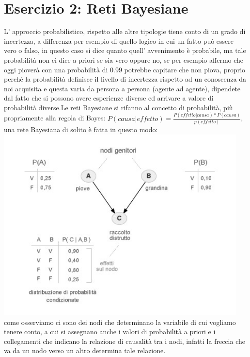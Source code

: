 		\section{Esercizio 2: Reti Bayesiane}
		\label{sec:es2}
		L' approccio probabilistico, rispetto alle altre tipologie tiene conto di un grado di incertezza, a differenza per esempio di quello logico in cui un fatto può essere vero o falso, in questo caso si dice quanto quell' avvenimento è probabile, ma tale probabilità non ci dice a priori se sia vero oppure no, se per esempio affermo che oggi pioverà con una probabilità di 0.99 potrebbe capitare che non piova, proprio perché la probabilità definisce il livello di incertezza rispetto ad un conoscenza da noi acquisita e questa varia da persona a persona (agente ad agente), dipendete dal fatto che si possono avere esperienze diverse ed arrivare a valore di probabilità diverse.Le reti Bayesiane si rifanno al concetto di probabilità, più propriamente alla regola di Bayes: $P(causa|effetto)=\frac{P(effetto|causa)*P(causa)}{p(effetto)}$, una rete Bayesiana di solito è fatta in questo modo:
		\includegraphics[width=0.95\textwidth, height=0.40\textheight]{retebayesiana.jpg}
		come osserviamo ci sono dei nodi che determinano la variabile di cui vogliamo tenere conto, a cui si assegnano anche i valori di probabilità a priori e i collegamenti che indicano la relazione di causalità tra i nodi, infatti la freccia che va da un nodo verso un altro determina tale relazione.
		\par 
